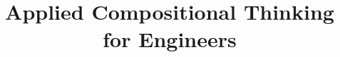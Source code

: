 \documentclass[paper=6in:9in,pagesize=pdftex,
 headinclude=off,footinclude=on,11pt,twoside]{scrbook}
\begin{document}
\title{Applied Compositional Thinking\\ for Engineers}
\date{}


\end{document}
